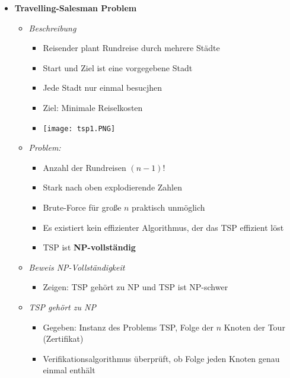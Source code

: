 \begin{itemize}
            \item \textbf{Travelling-Salesman Problem}
                \begin{itemize}
                    \item \textit{Beschreibung}
                        \begin{itemize}
                            \item Reisender plant Rundreise durch mehrere Städte
                            \item Start und Ziel ist eine vorgegebene Stadt
                            \item Jede Stadt nur einmal besucjhen
                            \item Ziel: Minimale Reiselkosten
                            \item[] \texttt{[image: tsp1.PNG]}
                        \end{itemize}
                    \item \textit{Problem:} 
                        \begin{itemize}
                            \item Anzahl der Rundreisen $(n-1)!$
                            \item Stark nach oben explodierende Zahlen
                            \item Brute-Force für große $n$ praktisch unmöglich
                            \item Es existiert kein effizienter Algorithmus, der das TSP effizient löst
                            \item TSP ist \textbf{NP-vollständig}
                        \end{itemize}
                    \item \textit{Beweis NP-Vollständigkeit}
                        \begin{itemize}
                            \item Zeigen: TSP gehört zu NP und TSP ist NP-schwer
                        \end{itemize}
                    \item \textit{TSP gehört zu NP}
                        \begin{itemize}
                            \item Gegeben: Instanz des Problems TSP, Folge der $n$ Knoten der Tour (Zertifikat)
                            \item Verifikationsalgorithmus überprüft, ob Folge jeden Knoten genau einmal enthält

\end{itemize}
\end{itemize}
\end{itemize}
